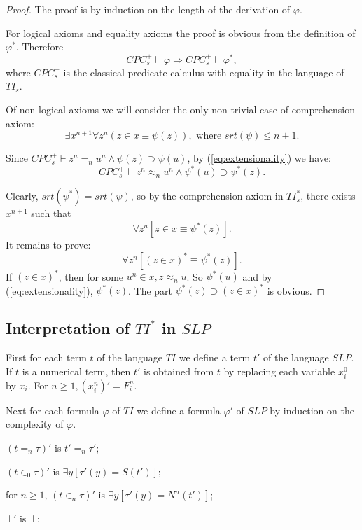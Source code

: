 \documentclass{asl}
\theoremstyle{definition}
\begin{document}
\begin{proof}
The proof is by induction on the length of the derivation of $\varphi$.

For logical axioms and equality axioms the proof is obvious from the definition of $\varphi^*$. Therefore
\begin{equation}
CPC_s^+\vdash\varphi \Rightarrow CPC_s^+\vdash\varphi^*,
\label{eq:extensionality}
\end{equation}
where $CPC_s^+$ is the classical predicate calculus with equality in the language of $TI_s$.

Of non-logical axioms we will consider the only non-trivial case of comprehension axiom:
\[\exists x^{n+1}\forall z^n(z\in x \equiv \psi(z)), \text{ where } srt(\psi)\leqslant n+1.\]

Since $CPC^+_s\vdash z^n=_nu^n \wedge \psi(z) \supset \psi(u)$, by (\ref{eq:extensionality}) we have:
\[CPC^+_s\vdash z^n\approx _n u^n \wedge \psi^*(u) \supset \psi^*(z).\]

Clearly, $srt(\psi^*)=srt(\psi)$, so by the comprehension axiom in $TI_s^*$, there exists $x^{n+1}$ such that 
\[\forall z^n\left[ z\in x \equiv \psi^*(z)\right] .\]
It remains to prove:
\[\forall z^n \left[ (z\in x)^* \equiv \psi^*(z)\right] .\]
If $(z\in x)^*$, then for some $u^n \in x, z\approx_n u$. So $\psi^*(u)$ and by (\ref{eq:extensionality}), $\psi^*(z)$. The part $\psi^*(z)\supset (z\in x)^*$ is obvious.
\end{proof}

\subsection{Interpretation of $TI^*$ in $SLP$}
First for each term $t$ of the language $TI$ we define a term $t'$ of the language $SLP$. 
If $t$ is a numerical term, then $t'$ is obtained from $t$ by replacing each variable $x_i^0$ by $x_i$. For $n\geqslant 1, (x_i^n)'=F_i^n$.

Next for each formula $\varphi$ of $TI$ we define a formula $\varphi'$ of $SLP$ by induction on the complexity of $\varphi$.
\smallskip

$(t=_n\tau)'$ is $t'=_n\tau'$;
\medskip

$(t\in_0\tau)'$ is $\exists y\left[\tau'(y)=S(t') \right]$;
\medskip

for $n\geqslant 1$, $(t\in_n\tau)'$ is $\exists y\left[\tau'(y)=N^n(t') \right]$;
\smallskip

$\bot'$ is $\bot$;
\smallskip
\end{document}
